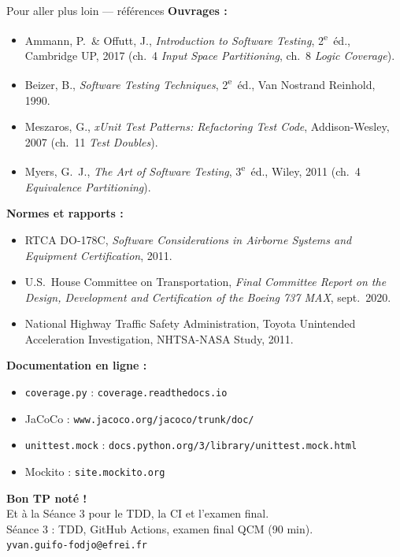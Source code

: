 \documentclass[aspectratio=169,11pt]{beamer}
\begin{document}
\begin{frame}[t]{Pour aller plus loin --- références}
\scriptsize
\textbf{Ouvrages :}
\begin{itemize}\itemsep0.1em
\item Ammann, P.\ \& Offutt, J., \emph{Introduction to Software Testing}, 2\textsuperscript{e}~éd., Cambridge UP, 2017 (ch.~4 \emph{Input Space Partitioning}, ch.~8 \emph{Logic Coverage}).
\item Beizer, B., \emph{Software Testing Techniques}, 2\textsuperscript{e}~éd., Van Nostrand Reinhold, 1990.
\item Meszaros, G., \emph{xUnit Test Patterns: Refactoring Test Code}, Addison-Wesley, 2007 (ch.~11 \emph{Test Doubles}).
\item Myers, G.\ J., \emph{The Art of Software Testing}, 3\textsuperscript{e}~éd., Wiley, 2011 (ch.~4 \emph{Equivalence Partitioning}).
\end{itemize}
\vspace{0.3em}
\textbf{Normes et rapports :}
\begin{itemize}\itemsep0.1em
\item RTCA DO-178C, \emph{Software Considerations in Airborne Systems and Equipment Certification}, 2011.
\item U.S.\ House Committee on Transportation, \emph{Final Committee Report on the Design, Development and Certification of the Boeing 737 MAX}, sept.\ 2020.
\item National Highway Traffic Safety Administration, Toyota Unintended Acceleration Investigation, NHTSA-NASA Study, 2011.
\end{itemize}
\vspace{0.3em}
\textbf{Documentation en ligne :}
\begin{itemize}\itemsep0.1em
\item \texttt{coverage.py} : \texttt{coverage.readthedocs.io}
\item JaCoCo : \texttt{www.jacoco.org/jacoco/trunk/doc/}
\item \texttt{unittest.mock} : \texttt{docs.python.org/3/library/unittest.mock.html}
\item Mockito : \texttt{site.mockito.org}
\end{itemize}
\end{frame}

\begin{frame}[plain]
\vspace{1.8cm}
\centering
{\color{white}\Huge\bfseries Bon TP noté !}\\[0.5cm]
{\color{white}\large Et à la Séance 3 pour le TDD, la CI et l'examen final.}\\[1.4cm]
{\color{white!85}\small Séance 3 : TDD, GitHub Actions, examen final QCM (90 min).}\\[0.4cm]
{\color{white!75}\scriptsize \texttt{yvan.guifo-fodjo@efrei.fr}}
\vfill
\end{frame}
\end{document}
